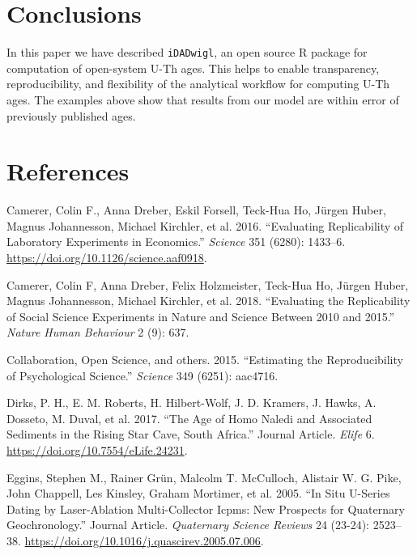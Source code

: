 \documentclass[]{elsarticle} %
\begin{document}
\FloatBarrier

\hypertarget{conclusions}{%
\section{Conclusions}\label{conclusions}}

In this paper we have described \texttt{iDADwigl}, an open source R package for computation of open-system U-Th ages. This helps to enable transparency, reproducibility, and flexibility of the analytical workflow for computing U-Th ages. The examples above show that results from our model are within error of previously published ages.

\newpage

\nolinenumbers

\hypertarget{references}{%
\section*{References}\label{references}}

\hypertarget{refs}{}
\leavevmode\hypertarget{ref-Camerer1433}{}%
Camerer, Colin F., Anna Dreber, Eskil Forsell, Teck-Hua Ho, Jürgen Huber, Magnus Johannesson, Michael Kirchler, et al. 2016. ``Evaluating Replicability of Laboratory Experiments in Economics.'' \emph{Science} 351 (6280): 1433--6. \url{https://doi.org/10.1126/science.aaf0918}.

\leavevmode\hypertarget{ref-camerer2018evaluating}{}%
Camerer, Colin F, Anna Dreber, Felix Holzmeister, Teck-Hua Ho, Jürgen Huber, Magnus Johannesson, Michael Kirchler, et al. 2018. ``Evaluating the Replicability of Social Science Experiments in Nature and Science Between 2010 and 2015.'' \emph{Nature Human Behaviour} 2 (9): 637.

\leavevmode\hypertarget{ref-open2015estimating}{}%
Collaboration, Open Science, and others. 2015. ``Estimating the Reproducibility of Psychological Science.'' \emph{Science} 349 (6251): aac4716.

\leavevmode\hypertarget{ref-Dirks2017}{}%
Dirks, P. H., E. M. Roberts, H. Hilbert-Wolf, J. D. Kramers, J. Hawks, A. Dosseto, M. Duval, et al. 2017. ``The Age of Homo Naledi and Associated Sediments in the Rising Star Cave, South Africa.'' Journal Article. \emph{Elife} 6. \url{https://doi.org/10.7554/eLife.24231}.

\leavevmode\hypertarget{ref-Eggins2005}{}%
Eggins, Stephen M., Rainer Grün, Malcolm T. McCulloch, Alistair W. G. Pike, John Chappell, Les Kinsley, Graham Mortimer, et al. 2005. ``In Situ U-Series Dating by Laser-Ablation Multi-Collector Icpms: New Prospects for Quaternary Geochronology.'' Journal Article. \emph{Quaternary Science Reviews} 24 (23-24): 2523--38. \url{https://doi.org/10.1016/j.quascirev.2005.07.006}.
\end{document}

